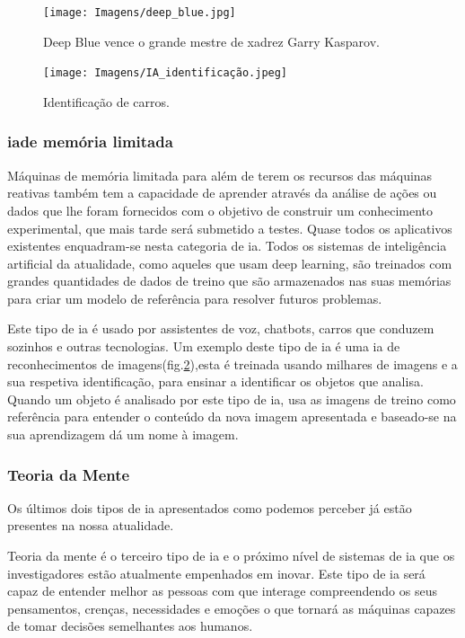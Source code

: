 \documentclass{report}
\begin{document}
\begin{figure}[h]
    \centering 
    \texttt{[image: Imagens/deep\_blue.jpg]}
    \caption{Deep Blue vence o grande mestre de xadrez Garry Kasparov.}
    \label{fig:Deep Blue}
\end{figure}




\begin{figure}[h]
    \centering  
    \texttt{[image: Imagens/IA\_identificação.jpeg]}
    \caption{Identificação de carros.}
    \label{fig:Ident}
\end{figure}

\subsubsection{\ac{ia}de memória limitada}
Máquinas de memória limitada para além de terem os recursos das máquinas reativas também tem a capacidade de aprender através da análise de ações ou dados que lhe foram fornecidos com o objetivo de construir um conhecimento experimental, que mais tarde será submetido a testes. Quase todos os aplicativos existentes enquadram-se nesta categoria de \ac{ia}. Todos os sistemas de inteligência artificial da atualidade, como aqueles que usam deep learning, são treinados com grandes quantidades de dados de treino que são armazenados nas suas memórias para criar um modelo de referência para resolver futuros problemas.


Este tipo de \ac{ia} é usado por assistentes de voz, chatbots, carros que conduzem sozinhos e outras tecnologias. 
Um exemplo deste tipo de \ac{ia} é uma \ac{ia} de reconhecimentos de imagens(fig.\ref{fig:Ident}),esta é treinada usando milhares de imagens e a sua respetiva identificação, para ensinar a identificar os objetos que analisa. Quando um objeto é analisado por este tipo de \ac{ia}, usa as imagens de treino como referência para entender o conteúdo da nova imagem apresentada e baseado-se na sua aprendizagem dá um nome à imagem.





\subsubsection{Teoria da Mente}
Os últimos dois tipos de \ac{ia} apresentados como podemos perceber já estão presentes na nossa atualidade.\par
Teoria da mente é o terceiro tipo de \ac{ia} e o próximo nível de sistemas de \ac{ia} que os investigadores estão atualmente empenhados em inovar. Este tipo de \ac{ia} será capaz de entender melhor as pessoas com que interage compreendendo os seus pensamentos, crenças, necessidades e emoções o que tornará as máquinas capazes de tomar decisões semelhantes aos humanos.
\end{document}
